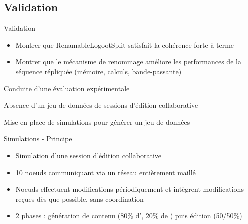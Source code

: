 \subsection{Validation}

\begin{frame}{Validation}
  \begin{itemize}
    \item \alert{Montrer que RenamableLogootSplit satisfait la cohérence forte à terme}
    \item \alert{Montrer que le mécanisme de renommage améliore les performances} de la séquence répliquée (mémoire, calculs, bande-passante)
  \end{itemize}
  \pause
  \begin{center}
    \alert{Conduite d'une évaluation expérimentale}
  \end{center}
\end{frame}

\begin{frame}[standout]
  \alert{Absence d'un jeu de données de sessions d'édition collaborative}

  \medskip
  \pause
  Mise en place de simulations pour générer un jeu de données
\end{frame}

\begin{frame}{Simulations - Principe}

  \begin{itemize}
    \item Simulation d'une session d'édition collaborative
    \item \alert{10 noeuds} communiquant via un \alert{réseau entièrement maillé}
    \item Noeuds \alert{effectuent modifications périodiquement} et \alert{intègrent modifications reçues} dès que possible, \alert{sans coordination}
    \item \alert{2 phases} : génération de contenu (80\% d'\ins, 20\% de \rmv) puis édition (50/50\%)
  \end{itemize}
\end{frame}

